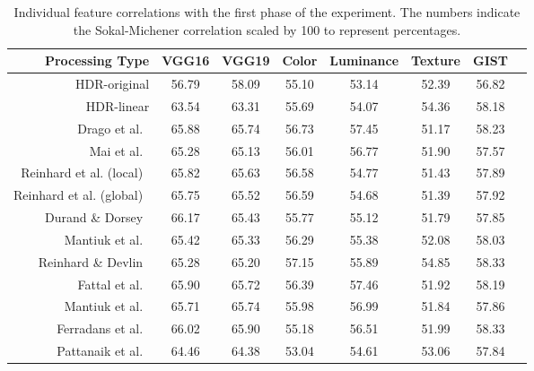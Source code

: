\begin{landscape}
\begin{table}
\caption{Individual feature correlations with the first phase of the experiment. The numbers indicate the Sokal-Michener correlation scaled by 100 to represent percentages.}
\centering
\begin{tabular}{r | c c c c c c c}
\label{tab:ind_correlation_p1}
\textbf{Processing Type} & \textbf{VGG16} & \textbf{VGG19} & \textbf{Color} & \textbf{Luminance} & \textbf{Texture} & \textbf{GIST}\\
\hline
HDR-original & 56.79 & 58.09 & 55.10 & 53.14 & 52.39 & 56.82 \\
HDR-linear & 63.54 & 63.31 & 55.69 & 54.07 & 54.36 & 58.18 \\
Drago et al.~\cite{drago2003adaptive} & 65.88 & 65.74 & 56.73 & 57.45 & 51.17 & 58.23 \\
Mai et al.~\cite{mai2011subjective} & 65.28 & 65.13 & 56.01 & 56.77 & 51.90 & 57.57 \\ 
Reinhard et al. (local)~\cite{reinhard2002photographic} & 65.82 & 65.63 & 56.58 & 54.77 & 51.43 & 57.89 \\
Reinhard et al. (global)~\cite{reinhard2002photographic} & 65.75 & 65.52 & 56.59 & 54.68 & 51.39 & 57.92 \\
Durand \& Dorsey~\cite{durand2002fast} & 66.17 & 65.43 & 55.77 & 55.12 & 51.79 & 57.85 \\
Mantiuk et al.~\cite{mantiuk2006backward} & 65.42 & 65.33 & 56.29 & 55.38 & 52.08 & 58.03 \\
Reinhard \& Devlin~\cite{reinhard2005dynamic} & 65.28 & 65.20 & 57.15 & 55.89 & 54.85 & 58.33 \\
Fattal et al.~\cite{durand2002fast} & 65.90 & 65.72 & 56.39 & 57.46 & 51.92 & 58.19 \\
Mantiuk et al.~\cite{mantiuk2008modeling} & 65.71 & 65.74 & 55.98 & 56.99 & 51.84 & 57.86 \\
Ferradans et al.~\cite{ferradans2011analysis} & 66.02 & 65.90 & 55.18 & 56.51 & 51.99 & 58.33 \\
Pattanaik et al.~\cite{pattanaik2000time} & 64.46 & 64.38 & 53.04 & 54.61 & 53.06 & 57.84 
\end{tabular}
\end{table}
\end{landscape}

